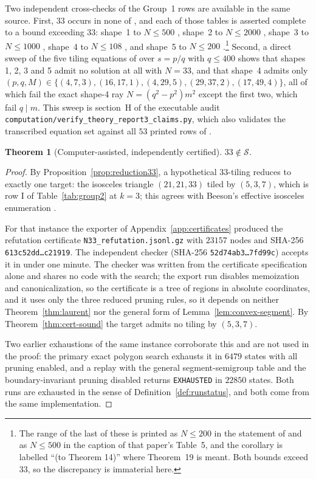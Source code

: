 \documentclass[11pt]{amsart}
\newtheorem{theorem}{Theorem}
\theoremstyle{definition}
\theoremstyle{remark}
\newcommand{\Sset}{\mathcal S}
\newcommand{\pathcode}[1]{\nolinkurl{#1}}
\begin{document}
\noindent Two independent cross-checks of the Group~1 rows are available in
the same source.  First, $33$ occurs in none of
\cite[Tables~1--5]{Beeson2229}, and each of those tables is asserted
complete to a bound exceeding $33$: shape~1 to $N\le500$
\cite[Cor.~1]{Beeson2229}, shape~2 to $N\le2000$ \cite[Table~2]{Beeson2229},
shape~3 to $N\le1000$ \cite[Cor.~2]{Beeson2229}, shape~4 to $N\le108$
\cite[Cor.~4]{Beeson2229}, and shape~5 to $N\le200$
\cite[Cor.~5]{Beeson2229}.\footnote{The range of the last of these is
printed as $N\le200$ in the statement of \cite[Cor.~5]{Beeson2229} and as
$N\le500$ in the caption of that paper's Table~5, and the corollary is
labelled ``(to Theorem 14)'' where Theorem~19 is meant.  Both bounds exceed
$33$, so the discrepancy is immaterial here.}  Second, a direct sweep of the
five tiling equations of \cite[Table~6]{Beeson2229} over
$s=p/q$ with $q\le400$ shows that shapes 1, 2, 3 and 5 admit no solution at
all with $N=33$, and that shape~4 admits only $(p,q,M)\in\{(4,7,3),(16,17,1),
(4,29,5),(29,37,2),(17,49,4)\}$, all of which fail the exact shape-4 ray
$N=(q^2-p^2)m^2$ except the first two, which fail $q\mid m$.  This sweep is
section~H of the executable audit
\pathcode{computation/verify_theory_report3_claims.py}, which also validates
the transcribed equation set against all $53$ printed rows of
\cite[Tables~1--5]{Beeson2229}.

\begin{theorem}[Computer-assisted, independently certified]\label{thm:no33}
$33\notin\Sset$.
\end{theorem}

\begin{proof}
By Proposition~\ref{prop:reduction33}, a hypothetical $33$-tiling reduces to
exactly one target: the isosceles triangle $(21,21,33)$ tiled by $(5,3,7)$,
which is row I of Table~\ref{tab:group2} at $k=3$; this agrees with Beeson's
effective isosceles enumeration \cite{BeesonIso}.

For that instance the exporter of Appendix~\ref{app:certificates} produced
the refutation certificate \pathcode{N33_refutation.jsonl.gz} with
$23157$ nodes and SHA-256 \texttt{613c52dd\ldots c21919}.  The independent checker
(SHA-256 \texttt{52d74ab3\ldots7fd99c}) accepts it in under one minute.  The checker was
written from the certificate specification alone and shares no code with the
search; the export run disables memoization and canonicalization, so the
certificate is a tree of regions in absolute coordinates, and it uses only
the three reduced pruning rules, so it depends on neither
Theorem~\ref{thm:laurent} nor the general form of
Lemma~\ref{lem:convex-segment}.  By Theorem~\ref{thm:cert-sound} the target
admits no tiling by $(5,3,7)$.

Two earlier exhaustions of the same instance corroborate this and are not
used in the proof: the primary exact polygon search exhausts it in $6479$
states with all pruning enabled, and a replay with the general
segment-semigroup table and the boundary-invariant pruning disabled returns
\texttt{EXHAUSTED} in $22850$ states.  Both runs are exhausted in the sense
of Definition~\ref{def:runstatus}, and both come from the same
implementation.
\end{proof}
\end{document}
